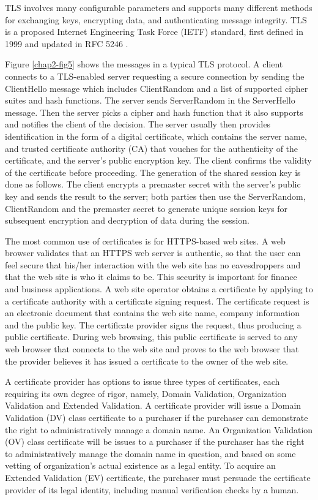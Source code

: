 \begin{multicols}{2}
TLS involves many configurable parameters and supports many different methods for exchanging keys, encrypting data, and authenticating message integrity. TLS is a proposed Internet Engineering Task Force (IETF) standard, first defined in 1999 and updated in RFC 5246 \cite{chap2-key16}.

Figure \ref{chap2-fig5} shows the messages in a typical TLS protocol. A client connects to a TLS-enabled server requesting a secure connection by sending the ClientHello message which includes ClientRandom and a list of supported cipher suites and hash functions. The server sends ServerRandom in the ServerHello message. Then the server picks a cipher and hash function that it also supports and notifies the client of the decision. The server usually then provides identification in the form of a digital certificate, which contains the server name, and trusted certificate authority (CA) that vouches for the authenticity of the certificate, and the server's public encryption key. The client confirms the validity of the certificate before proceeding. The generation of the shared session key is done as follows. The client encrypts a premaster secret with the server's public key and sends the result to the server; both parties then use the ServerRandom, ClientRandom and the premaster secret to generate unique session keys for subsequent encryption and decryption of data during the session.

The most common use of certificates is for HTTPS-based web sites. A web browser validates that an HTTPS web server is authentic, so that the user can feel secure that his/her interaction with the web site has no eavesdroppers and that the web site is who it claims to be. This security is important for finance and business applications. A web site operator obtains a certificate by applying to a certificate authority with a certificate signing request. The certificate request is an electronic document that contains the web site name, company information and the public key. The certificate provider signs the request, thus producing a public certificate. During web browsing, this public certificate is served to any web browser that connects to the web site and proves to the web browser that the provider believes it has issued a certificate to the owner of the web site.

A certificate provider has options to issue three types of certificates, each requiring its own degree of rigor, namely, Domain Validation, Organization Validation and Extended Validation. A certificate provider will issue a Domain Validation (DV) class certificate to a purchaser if the purchaser can demonstrate the right to administratively manage a domain name. An Organization Validation (OV) class certificate will be issues to a purchaser if the purchaser has the right to administratively manage the domain name in question, and based on some vetting of organization's actual existence as a legal entity. To acquire an Extended Validation (EV) certificate, the purchaser must persuade the certificate provider of its legal identity, including manual verification checks by a human.


\end{multicols}
